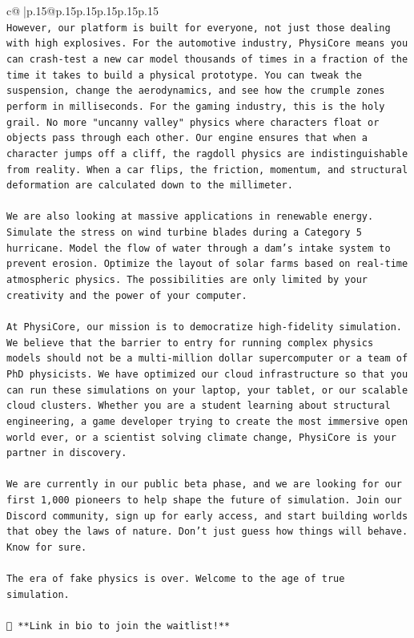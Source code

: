 \documentclass{article}
\begin{document}
{\begin{supertabular}{c@{$\;$}|p{.15\linewidth}@{}p{.15\linewidth}p{.15\linewidth}p{.15\linewidth}p{.15\linewidth}p{.15\linewidth}}
{{{\\ 
\texttt{However, our platform is built for everyone, not just those dealing with high explosives. For the automotive industry, PhysiCore means you can crash{-}test a new car model thousands of times in a fraction of the time it takes to build a physical prototype. You can tweak the suspension, change the aerodynamics, and see how the crumple zones perform in milliseconds. For the gaming industry, this is the holy grail. No more "uncanny valley" physics where characters float or objects pass through each other. Our engine ensures that when a character jumps off a cliff, the ragdoll physics are indistinguishable from reality. When a car flips, the friction, momentum, and structural deformation are calculated down to the millimeter.} \\
\\ 
\texttt{We are also looking at massive applications in renewable energy. Simulate the stress on wind turbine blades during a Category 5 hurricane. Model the flow of water through a dam's intake system to prevent erosion. Optimize the layout of solar farms based on real{-}time atmospheric physics. The possibilities are only limited by your creativity and the power of your computer.} \\
\\ 
\texttt{At PhysiCore, our mission is to democratize high{-}fidelity simulation. We believe that the barrier to entry for running complex physics models should not be a multi{-}million dollar supercomputer or a team of PhD physicists. We have optimized our cloud infrastructure so that you can run these simulations on your laptop, your tablet, or our scalable cloud clusters. Whether you are a student learning about structural engineering, a game developer trying to create the most immersive open world ever, or a scientist solving climate change, PhysiCore is your partner in discovery.} \\
\\ 
\texttt{We are currently in our public beta phase, and we are looking for our first 1,000 pioneers to help shape the future of simulation. Join our Discord community, sign up for early access, and start building worlds that obey the laws of nature. Don't just guess how things will behave. Know for sure.} \\
\\ 
\texttt{The era of fake physics is over. Welcome to the age of true simulation.} \\
\\ 
\texttt{🔗 **Link in bio to join the waitlist!**} \\
}}}
\end{supertabular}}
\end{document}
